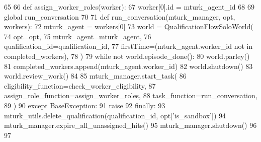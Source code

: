 \begin{DoxyCode}
65 
66         \textcolor{keyword}{def }assign\_worker\_roles(worker):
67             worker[0].id = mturk\_agent\_id
68 
69         \textcolor{keyword}{global} run\_conversation
70 
71         \textcolor{keyword}{def }run\_conversation(mturk\_manager, opt, workers):
72             mturk\_agent = workers[0]
73             world = QualificationFlowSoloWorld(
74                 opt=opt,
75                 mturk\_agent=mturk\_agent,
76                 qualification\_id=qualification\_id,
77                 firstTime=(mturk\_agent.worker\_id \textcolor{keywordflow}{not} \textcolor{keywordflow}{in} completed\_workers),
78             )
79             \textcolor{keywordflow}{while} \textcolor{keywordflow}{not} world.episode\_done():
80                 world.parley()
81             completed\_workers.append(mturk\_agent.worker\_id)
82             world.shutdown()
83             world.review\_work()
84 
85         mturk\_manager.start\_task(
86             eligibility\_function=check\_worker\_eligibility,
87             assign\_role\_function=assign\_worker\_roles,
88             task\_function=run\_conversation,
89         )
90     \textcolor{keywordflow}{except} BaseException:
91         \textcolor{keywordflow}{raise}
92     \textcolor{keywordflow}{finally}:
93         mturk\_utils.delete\_qualification(qualification\_id, opt[\textcolor{stringliteral}{'is\_sandbox'}])
94         mturk\_manager.expire\_all\_unassigned\_hits()
95         mturk\_manager.shutdown()
96 
97 
\end{DoxyCode}
